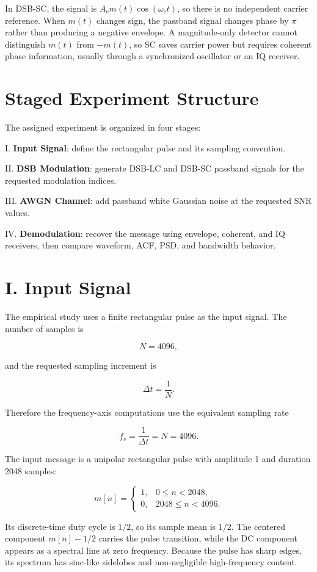 \documentclass[11pt]{article}
\begin{document}
In DSB-SC, the signal is $A_c m(t)\cos(\omega_c t)$, so there is no independent carrier reference. When $m(t)$ changes sign, the passband signal changes phase by $\pi$ rather than producing a negative envelope. A magnitude-only detector cannot distinguish $m(t)$ from $-m(t)$, so SC saves carrier power but requires coherent phase information, usually through a synchronized oscillator or an IQ receiver.

\section{Staged Experiment Structure}

The assigned experiment is organized in four stages:

I. \textbf{Input Signal}: define the rectangular pulse and its sampling convention.

II. \textbf{DSB Modulation}: generate DSB-LC and DSB-SC passband signals for the requested modulation indices.

III. \textbf{AWGN Channel}: add passband white Gaussian noise at the requested SNR values.

IV. \textbf{Demodulation}: recover the message using envelope, coherent, and IQ receivers, then compare waveform, ACF, PSD, and bandwidth behavior.

\section{I. Input Signal}

The empirical study uses a finite rectangular pulse as the input signal. The number of samples is

\[
N=4096,
\]

and the requested sampling increment is

\[
\Delta t=\frac{1}{N}.
\]

Therefore the frequency-axis computations use the equivalent sampling rate

\[
f_s=\frac{1}{\Delta t}=N=4096.
\]

The input message is a unipolar rectangular pulse with amplitude 1 and duration 2048 samples:

\[
m[n]=
\begin{cases}
1, & 0\leq n<2048,\\
0, & 2048\leq n<4096.
\end{cases}
\]

Its discrete-time duty cycle is $1/2$, so its sample mean is $1/2$. The centered component $m[n]-1/2$ carries the pulse transition, while the DC component appears as a spectral line at zero frequency. Because the pulse has sharp edges, its spectrum has sinc-like sidelobes and non-negligible high-frequency content.
\end{document}
